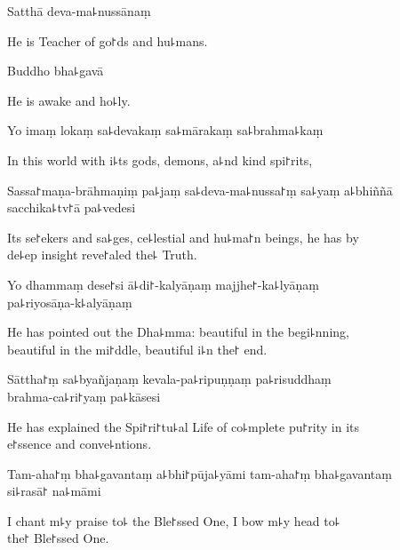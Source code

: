 Satthā deva-ma꜕nussānaṃ

\begin{english}
  He is Teacher of go꜓ds and hu꜕mans.
\end{english}

Buddho bha꜕gavā

\begin{english}
  He is awake and ho꜕ly.
\end{english}

Yo imaṃ lokaṃ sa꜕devakaṃ sa꜕mārakaṃ sa꜕brahma꜕kaṃ

\begin{english}
  In this world with i꜕ts gods, demons, a꜕nd kind spi꜓rits,
\end{english}

Sassa꜓maṇa-brāhmaṇiṃ pa꜕jaṃ sa꜕deva-ma꜕nussa꜓ṃ sa꜕yaṃ a꜕bhiññā sacchika꜕tv꜓ā pa꜕vedesi

\begin{english}
  Its se꜓ekers and sa꜕ges, ce꜕lestial and hu꜕ma꜓n beings, he has by \\de꜕ep insight reve꜓aled the꜕ Truth.
\end{english}

Yo dhammaṃ dese꜓si ā꜕di꜓-kalyāṇaṃ majjhe꜓-ka꜕lyāṇaṃ \\pa꜕riyosāṇa-k꜕alyāṇaṃ

\begin{english}
  He has pointed out the Dha꜕mma: beautiful in the begi꜕nning, \\beautiful in the mi꜓ddle, beautiful i꜕n the꜓ end.
\end{english}

Sāttha꜓ṃ sa꜕byañjaṇaṃ kevala-pa꜕ripuṇṇaṃ pa꜕risuddhaṃ \\brahma-ca꜕ri꜓yaṃ pa꜕kāsesi

\begin{english}
  He has explained the Spi꜓ri꜓tu꜕al Life of co꜕mplete pu꜓rity in its \\e꜓ssence and conve꜕ntions.
\end{english}

Tam-aha꜓ṃ bha꜕gavantaṃ a꜕bhi꜓pūja꜕yāmi tam-aha꜓ṃ bha꜕gavantaṃ \\si꜕rasā꜓ na꜕māmi

\begin{english}
  I chant m꜕y praise to꜕ the Ble꜓ssed One, I bow m꜕y head to꜕ \\the꜓ Ble꜓ssed One.
\end{english}

\clearpage

